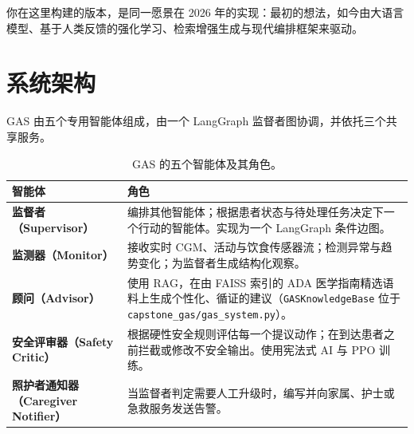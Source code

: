 \documentclass[11pt,a4paper,openany]{book}
\begin{document}
你在这里构建的版本，是同一愿景在 2026 年的实现：最初的想法，如今由大语言模型、基于人类反馈的强化学习、检索增强生成与现代编排框架来驱动。

\section*{系统架构}
\label{gas-architecture}

GAS 由五个专用智能体组成，由一个 LangGraph 监督者图协调，并依托三个共享服务。

\begin{table}[ht!]
\centering
\small
\begin{tabular}{lp{9.5cm}}
\hline
\textbf{智能体} & \textbf{角色} \\
\hline
\textbf{监督者（Supervisor）} & 编排其他智能体；根据患者状态与待处理任务决定下一个行动的智能体。实现为一个 LangGraph 条件边图。 \\
\textbf{监测器（Monitor）} & 接收实时 CGM、活动与饮食传感器流；检测异常与趋势变化；为监督者生成结构化观察。 \\
\textbf{顾问（Advisor）} & 使用 RAG，在由 FAISS 索引的 ADA 医学指南精选语料上生成个性化、循证的建议（\texttt{GASKnowledgeBase} 位于 \texttt{capstone\_gas/gas\_system.py}）。 \\
\textbf{安全评审器（Safety Critic）} & 根据硬性安全规则评估每一个提议动作；在到达患者之前拦截或修改不安全输出。使用宪法式 AI 与 PPO 训练。 \\
\textbf{照护者通知器（Caregiver Notifier）} & 当监督者判定需要人工升级时，编写并向家属、护士或急救服务发送告警。 \\
\hline
\end{tabular}
\caption{GAS 的五个智能体及其角色。}
\label{tab:gas-agents}
\end{table}
\end{document}
